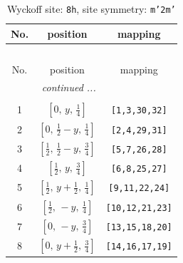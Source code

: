 \documentclass[fleqn,8pt]{jsarticle}
\begin{document}
\begin{longtable}{ccc}
\caption{Wyckoff site: {\tt 8h}, site symmetry: {\tt m'2m'}}
 \\
 \hline \hline
No. & position & mapping \\ \hline \endfirsthead

\multicolumn{2}{l}{\tablename\ \thetable{}} \\
 \hline \hline
No. & position & mapping \\ \hline \endhead

 \hline \hline
\multicolumn{2}{r}{\footnotesize\it continued ...} \\ \endfoot

 \hline \hline
\multicolumn{2}{r}{} \\ \endlastfoot

1 & $\left[ 0,\, y,\, \frac{1}{4} \right]$ & {\tt [1,3,30,32]} \\ \hline
2 & $\left[ 0,\, \frac{1}{2} - y,\, \frac{1}{4} \right]$ & {\tt [2,4,29,31]} \\ \hline
3 & $\left[ \frac{1}{2},\, \frac{1}{2} - y,\, \frac{3}{4} \right]$ & {\tt [5,7,26,28]} \\ \hline
4 & $\left[ \frac{1}{2},\, y,\, \frac{3}{4} \right]$ & {\tt [6,8,25,27]} \\ \hline
5 & $\left[ \frac{1}{2},\, y + \frac{1}{2},\, \frac{1}{4} \right]$ & {\tt [9,11,22,24]} \\ \hline
6 & $\left[ \frac{1}{2},\, - y,\, \frac{1}{4} \right]$ & {\tt [10,12,21,23]} \\ \hline
7 & $\left[ 0,\, - y,\, \frac{3}{4} \right]$ & {\tt [13,15,18,20]} \\ \hline
8 & $\left[ 0,\, y + \frac{1}{2},\, \frac{3}{4} \right]$ & {\tt [14,16,17,19]} \\
\end{longtable}
\renewcommand{\arraystretch}{1.2}
\end{document}

